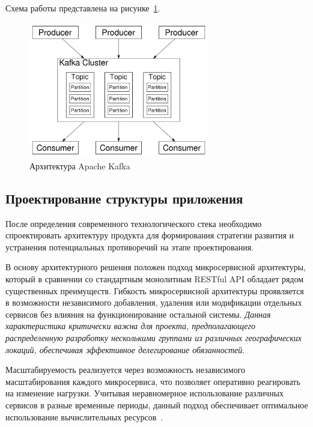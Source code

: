 Схема работы представлена на рисунке~\ref{fig:kafka_architecture}.
\begin{figure}[htbp]
    \centering
    \includegraphics[width=0.7\textwidth]{Dissertation/images/kafka_scheme}
    \caption{Архитектура Apache Kafka}
    \label{fig:kafka_architecture}
\end{figure}

\subsection{Проектирование структуры приложения}

После определения современного технологического стека необходимо спроектировать архитектуру продукта для формирования стратегии развития и устранения потенциальных противоречий на этапе проектирования.

В основу архитектурного решения положен подход микросервисной архитектуры, который в сравнении со стандартным монолитным RESTful API обладает рядом существенных преимуществ.
Гибкость микросервисной архитектуры проявляется в возможности независимого добавления, удаления или модификации отдельных сервисов без влияния на функционирование остальной системы. \textit{Данная характеристика критически важна для проекта, предполагающего распределенную разработку несколькими группами из различных географических локаций, обеспечивая эффективное делегирование обязанностей}.

Масштабируемость реализуется через возможность независимого масштабирования каждого микросервиса, что позволяет оперативно реагировать на изменение нагрузки. Учитывая неравномерное использование различных сервисов в разные временные периоды, данный подход обеспечивает оптимальное использование вычислительных ресурсов~\cite{15_dragoni2017}.

